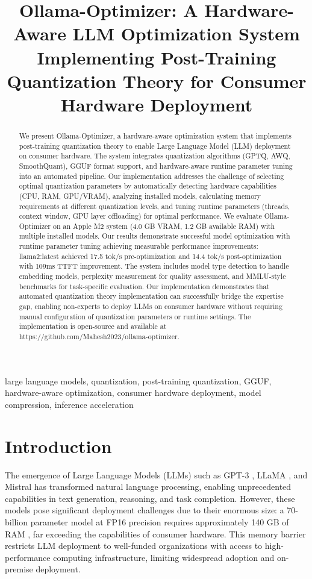 \documentclass[journal]{IEEEtran}
\title{Ollama-Optimizer: A Hardware-Aware LLM Optimization System Implementing Post-Training Quantization Theory for Consumer Hardware Deployment}
\author{\IEEEauthorblockN{A. Mahesh Bhat}
\IEEEauthorblockA{\textit{Independent Researcher}\\
Bangalore, India\\
M.Tech Advanced Computing, NIT Bhopal, 2023\\
Email: mbhat648@gmail.com}}
\begin{document}
\maketitle

\begin{abstract}
We present Ollama-Optimizer, a hardware-aware optimization system that implements post-training quantization theory to enable Large Language Model (LLM) deployment on consumer hardware. The system integrates quantization algorithms (GPTQ, AWQ, SmoothQuant), GGUF format support, and hardware-aware runtime parameter tuning into an automated pipeline. Our implementation addresses the challenge of selecting optimal quantization parameters by automatically detecting hardware capabilities (CPU, RAM, GPU/VRAM), analyzing installed models, calculating memory requirements at different quantization levels, and tuning runtime parameters (threads, context window, GPU layer offloading) for optimal performance. We evaluate Ollama-Optimizer on an Apple M2 system (4.0 GB VRAM, 1.2 GB available RAM) with multiple installed models. Our results demonstrate successful model optimization with runtime parameter tuning achieving measurable performance improvements: llama2:latest achieved 17.5 tok/s pre-optimization and 14.4 tok/s post-optimization with 109ms TTFT improvement. The system includes model type detection to handle embedding models, perplexity measurement for quality assessment, and MMLU-style benchmarks for task-specific evaluation. Our implementation demonstrates that automated quantization theory implementation can successfully bridge the expertise gap, enabling non-experts to deploy LLMs on consumer hardware without requiring manual configuration of quantization parameters or runtime settings. The implementation is open-source and available at https://github.com/Mahesh2023/ollama-optimizer.
\end{abstract}

\begin{IEEEkeywords}
large language models, quantization, post-training quantization, GGUF, hardware-aware optimization, consumer hardware deployment, model compression, inference acceleration
\end{IEEEkeywords}

\section{Introduction}

The emergence of Large Language Models (LLMs) such as GPT-3 \cite{brown2020}, LLaMA \cite{touvron2023}, and Mistral \cite{jiang2023} has transformed natural language processing, enabling unprecedented capabilities in text generation, reasoning, and task completion. However, these models pose significant deployment challenges due to their enormous size: a 70-billion parameter model at FP16 precision requires approximately 140 GB of RAM \cite{frantar2022}, far exceeding the capabilities of consumer hardware. This memory barrier restricts LLM deployment to well-funded organizations with access to high-performance computing infrastructure, limiting widespread adoption and on-premise deployment.
\end{document}

